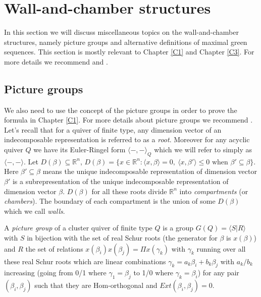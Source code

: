 \section{Wall-and-chamber structures}
\indent In this section we will discuss miscellaneous topics on the wall-and-chamber structures, namely picture groups and alternative definitions of maximal green sequences. This section is mostly relevant to Chapter \ref{C1} and Chapter \ref{C3}. For more details we recommend \cite{GHKK14}\cite{Mul15}\cite{BST17}\cite{BST18A}\cite{BST18B}\cite{IOTW15} and \cite{IT17}.\\
\subsection{Picture groups}\label{Picgr}
\indent We also need to use the concept of the picture groups in order to prove the formula in Chapter \ref{C1}. For more details about picture groups we recommend \cite{IT17}.\\
\indent Let's recall that for a quiver of finite type, any dimension vector of an indecomposable representation is referred to as a \textit{root}. Moreover for any acyclic quiver $Q$ we have its Euler-Ringel form $\langle -,-\rangle_Q$ which we will refer to simply as $\langle -,-\rangle$. Let $D(\beta)\subseteq\mathbb{R}^n$, $D(\beta)= \{x\in\mathbb{R}^n: \langle x,\beta\rangle=0,\ \langle x,\beta'\rangle\leq 0\text{ when }\beta'\subseteq\beta\}$. Here $\beta'\subseteq\beta$ means the unique indecomposable representation of dimension vector $\beta'$ is a subrepresentation of the unique indecomposable representation of dimension vector $\beta$. $D(\beta)$ for all these roots divide $\mathbb{R}^n$ into \textit{compartments} (or \textit{chambers}). The boundary of each compartment is the union of some $D(\beta)$ which we call \textit{walls}.\cite{IT17}\cite{IOTW4}\\
\begin{definition}
\cite{IT17} A \textit{picture group} of a cluster quiver of finite type $Q$ is a group $G(Q)=\langle S|R\rangle$ with $S$ in bijection with the set of real Schur roots (the generator for $\beta$ is $x(\beta)$) and $R$ the set of relations $x(\beta_i)x(\beta_j)=\Pi x(\gamma_k)$ with $\gamma_k$ running over all these real Schur roots which are linear combinations $\gamma_k = a_k\beta_i+b_k\beta_j$ with $a_k/b_k$ increasing (going from 0/1 where $\gamma_1=\beta_j$ to 1/0 where $\gamma_k=\beta_i$) for any pair $(\beta_i,\beta_j)$ such that they are Hom-orthogonal and $Ext(\beta_i,\beta_j)=0$.\\
\end{definition}
